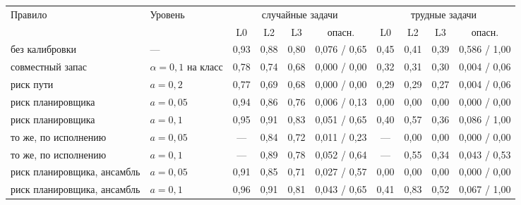 \begin{tabular}{ll|ccc|c|ccc|c}
\toprule
Правило & Уровень & \multicolumn{4}{c|}{случайные задачи} & \multicolumn{4}{c}{трудные задачи} \\
 & & L0 & L2 & L3 & опасн. & L0 & L2 & L3 & опасн. \\
\midrule
без калибровки & --- & 0{,}93 & 0{,}88 & 0{,}80 & 0{,}076 / 0{,}65 & 0{,}45 & 0{,}41 & 0{,}39 & 0{,}586 / 1{,}00 \\
совместный запас & $\alpha = 0{,}1$ на класс & 0{,}78 & 0{,}74 & 0{,}68 & 0{,}000 / 0{,}00 & 0{,}32 & 0{,}31 & 0{,}30 & 0{,}004 / 0{,}06 \\
риск пути & $a = 0{,}2$ & 0{,}77 & 0{,}69 & 0{,}68 & 0{,}000 / 0{,}00 & 0{,}29 & 0{,}29 & 0{,}27 & 0{,}004 / 0{,}06 \\
риск планировщика & $a = 0{,}05$ & 0{,}94 & 0{,}86 & 0{,}76 & 0{,}006 / 0{,}13 & 0{,}00 & 0{,}00 & 0{,}00 & 0{,}000 / 0{,}00 \\
риск планировщика & $a = 0{,}1$ & 0{,}95 & 0{,}91 & 0{,}83 & 0{,}051 / 0{,}65 & 0{,}40 & 0{,}57 & 0{,}36 & 0{,}086 / 1{,}00 \\
то же, по исполнению & $a = 0{,}05$ & --- & 0{,}84 & 0{,}72 & 0{,}011 / 0{,}23 & --- & 0{,}00 & 0{,}00 & 0{,}000 / 0{,}00 \\
то же, по исполнению & $a = 0{,}1$ & --- & 0{,}89 & 0{,}78 & 0{,}052 / 0{,}64 & --- & 0{,}55 & 0{,}34 & 0{,}043 / 0{,}53 \\
риск планировщика, ансамбль & $a = 0{,}05$ & 0{,}91 & 0{,}85 & 0{,}71 & 0{,}027 / 0{,}57 & 0{,}00 & 0{,}00 & 0{,}00 & 0{,}000 / 0{,}00 \\
риск планировщика, ансамбль & $a = 0{,}1$ & 0{,}96 & 0{,}91 & 0{,}81 & 0{,}043 / 0{,}65 & 0{,}41 & 0{,}83 & 0{,}52 & 0{,}067 / 1{,}00 \\
\bottomrule
\end{tabular}
